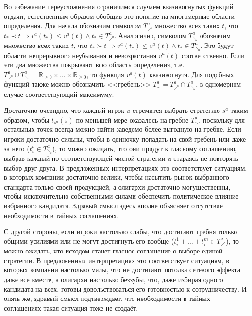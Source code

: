 Во избежание переусложнения ограничимся случаем квазивогнутых функций отдачи, естественным образом обобщив это понятие на многомерные области определения. Для начала обозначим символом $T^a_{\nearrow}$ множество всех таких $t$, что $t_* \prec t \Rightarrow v^a(t_*) \le v^a(t) \wedge t_* \in T^a_{\nearrow}$. Аналогично, символом $T^a_{\searrow}$ обозначим множество всех таких $t$, что $t_* \succ t \Rightarrow v^a(t_*) \le v^a(t) \wedge t_* \in T^a_{\searrow}$. Это будут области непрерывного неубывания и невозрастания $v^a(t)$ соответственно. Если эти два множества покрывают всю область определения, т.е. $T^a_{\nearrow} \cup T^a_{\searrow} = \mathbb{R}_{\ge 0} \times \ldots \times \mathbb{R}_{\ge 0}$, то функция $v^a(t)$ квазивогнута. Для подобных функций также можно обозначить <<гребень>> $T^a_{\sim} = T^a_{\nearrow} \cap T^a_{\searrow}$, в одномерном случае соответствующий максимуму.

Достаточно очевидно, что каждый игрок $a$ стремится выбрать стратегию $s^a$ таким образом, чтобы $t_{s^a}(s)$ по меньшей мере оказалось на гребне $T^a_{\sim}$, поскольку для остальных точек всегда можно найти заведомо более выгодную на гребне. Если игроки достаточно сильны, чтобы в одиночку попадать на свой гребень или даже за него ($t^a_i \in T^a_{\searrow}$), то можно ожидать, что они придут к гласному соглашению, выбрав каждый по соответствующей чистой стратегии и стараясь не повторять выбор друг друга. В предложенных интерпретациях это соответствует ситуациям, в которых компании достаточно велики, чтобы насытить рынок выбранного стандарта только своей продукцией, а олигархи достаточно могущественны, чтобы исключительно собственными силами обеспечить политическое влияние избранного кандидата. Здравый смысл здесь вполне объясняет отсутствие необходимости в тайных соглашениях.

С другой стороны, если игроки настолько слабы, что достигают гребня только общими усилиями или не могут достигнуть его вообще ($t^1_i + \ldots + t^m_i \in T^a_{\nearrow}$), то можно ожидать, что исходом станет гласное соглашение о выборе единой стратегии. В предложенных интерпретациях это соответствует ситуациям, в которых компании настолько малы, что не достигают потолка сетевого эффекта даже все вместе, а олигархи настолько беззубы, что, даже избирая одного кандидата на всех, готовы довольствоваться его готовностью к сотрудничеству. И опять же, здравый смысл подтверждает, что необходимости в тайных соглашениях такая ситуация тоже не создаёт.

